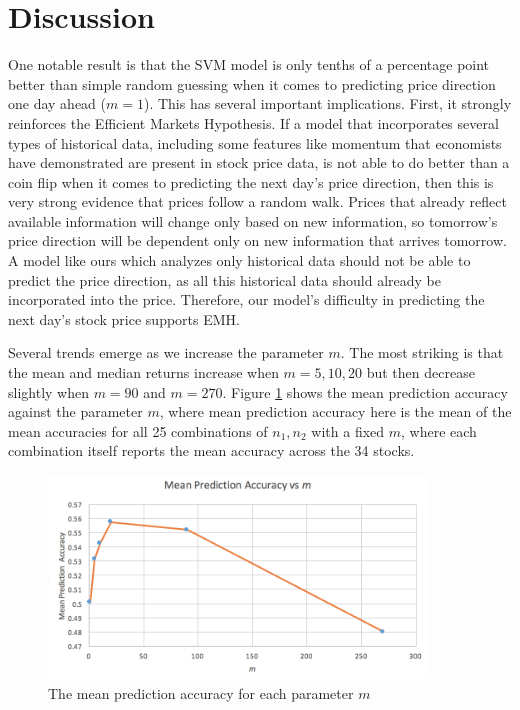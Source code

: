 \documentclass[pageno]{jpaper}
\begin{document}
\section{Discussion}
One notable result is that the SVM model is only tenths of a percentage point better than simple random guessing when it comes to predicting price direction one day ahead ($m=1$). This has several important implications. First, it strongly reinforces the Efficient Markets Hypothesis. If a model that incorporates several types of historical data, including some features like momentum that economists have demonstrated are present in stock price data, is not able to do better than a coin flip when it comes to predicting the next day's price direction, then this is very strong evidence that prices follow a random walk. Prices that already reflect available information will change only based on new information, so tomorrow's price direction will be dependent only on new information that arrives tomorrow. A model like ours which analyzes only historical data should not be able to predict the price direction, as all this historical data should already be incorporated into the price. Therefore, our model's difficulty in predicting the next day's stock price supports EMH.

Several trends emerge as we increase the parameter $m$. The most striking is that the mean and median returns increase when $m=5,10,20$ but then decrease slightly when $m=90$ and $m=270$. Figure \ref{fig: meanvsm} shows the mean prediction accuracy against the parameter $m$, where mean prediction accuracy here is the mean of the mean accuracies for all 25 combinations of $n_1, n_2$ with a fixed $m$, where each combination itself reports the mean accuracy across the 34 stocks.
\vspace{20pt}

\begin{figure}[htb]
\includegraphics[width=0.9\textwidth]{MeanReturnvsM.png}
\caption{The mean prediction accuracy for each parameter $m$}
\label{fig: meanvsm}
\end{figure}
\end{document}
